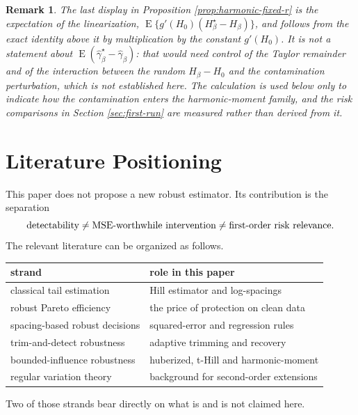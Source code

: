 \documentclass[11pt]{article}
\newtheorem{remark}{Remark}
\DeclareMathOperator{\E}{E}
\newcommand{\ghat}{\widehat{\gamma}}
\begin{document}
\begin{remark}
\label{rem:harmonic-linearization}
The last display in Proposition \ref{prop:harmonic-fixed-r} is the expectation
of the linearization, $\E\{g'(H_0)(H_\beta^\star-H_\beta)\}$, and follows from
the exact identity above it by multiplication by the constant $g'(H_0)$.  It is
not a statement about $\E(\ghat_\beta^\star-\ghat_\beta)$: that would need
control of the Taylor remainder and of the interaction between the random
$H_\beta-H_0$ and the contamination perturbation, which is not established
here.  The calculation is used below only to indicate how the contamination
enters the harmonic-moment family, and the risk comparisons in Section
\ref{sec:first-run} are measured rather than derived from it.
\end{remark}

\section{Literature Positioning}

This paper does not propose a new robust estimator.  Its contribution
is the separation
\[
  \hbox{detectability}
  \ne
  \hbox{MSE-worthwhile intervention}
  \ne
  \hbox{first-order risk relevance}.
\]
The relevant literature can be organized as follows.

\begin{center}
\small
\begin{tabular}{@{}lp{}@{}}
\toprule
strand & role in this paper\\
\midrule
classical tail estimation &
Hill estimator and log-spacings
\citep{hill-1975,renyi-1953,beirlant-dierckx-guillou-starica-2002}\\
\addlinespace[2pt]
robust Pareto efficiency &
the price of protection on clean data
\citep{brazauskas-serfling-2000,brazauskas-serfling-2001,
finkelstein-tucker-veeh-2006,brzezinski-2016}\\
\addlinespace[2pt]
spacing-based robust decisions &
squared-error and regression rules
\citep{hsieh-1999,minkah-dewet-ghosh-2023}\\
\addlinespace[2pt]
trim-and-detect robustness &
adaptive trimming and recovery
\citep{bhattacharya-kallitsis-stoev-2019}\\
\addlinespace[2pt]
bounded-influence robustness &
huberized, t-Hill and harmonic-moment
\citep{beran-schell-2012,beran-schell-stehlik-2014,
jordanova-fabian-hermann-2016,vandewalle-beirlant-christmann-hubert-2007,
ruckdeschel-horbenko-2010}\\
\addlinespace[2pt]
regular variation theory &
background for second-order extensions
\citep{dehaan-ferreira-2006,dehaan-stadtmuller-1996}\\
\bottomrule
\end{tabular}
\end{center}
Two of those strands bear directly on what is and is not claimed here.
\end{document}
